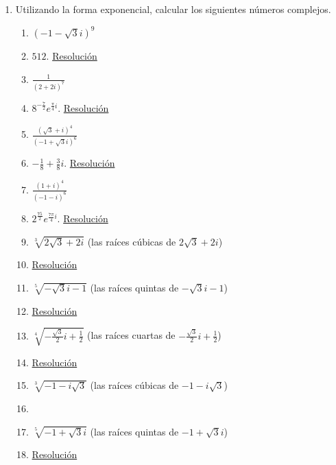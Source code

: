 \documentclass[a4paper]{article}
\newcommand{\answer}{\item[**]}
\newcommand{\exercise}{\item}
\newcommand{\df}[2]{\displaystyle\frac{#1}{#2}}
\begin{document}
\begin{enumerate}
\begin{enumerate} [label=(\alph*)]
		\item $\df{y+3i}{2-5i}$ es un número real puro
		\answer $y=-\df{6}{5}$\. href{https://youtu.be/cgQsvNewGZ0}{Resolución}

		\item $(5x+2m)+m^3i = 9-27i$
		\answer $(x,m)=(3,-3)$. \href{https://youtu.be/kQmzdYU4EsY}{Resolución}

	\end{enumerate}


	\exercise Utilizando la forma exponencial, calcular los siguientes números complejos.
	\begin{multicols}{2}
	\begin{enumerate} [label=(\alph*)]
		
		\item $(-1-\sqrt{3}i)^9$
		\answer $512$. \href{https://youtu.be/bi_tVZZeAtY}{Resolución}

		\item $\df{1}{(2+2i)^7}$
		\answer $8^{-\frac{7}{2}} e^{\frac{\pi}{4}i}$. \href{https://youtu.be/5ET1IAoQNdc}{Resolución}

		\item $\df{(\sqrt{3}+i)^4}{(-1+\sqrt{3}i)^6}$
		\answer $-\df{1}{8}+\df{3}{8}i$. \href{https://youtu.be/xveCBuIad3s}{Resolución}

		\item $\df{(1+i)^4}{(-1-i)^6}$
		\answer $2^{\frac{75}{2}} e^{\frac{7\pi}{4}i}$. \href{https://youtu.be/fyrIGxGpW8g}{Resolución}

		\item $\sqrt[3]{2\sqrt{3}+2i}$ (las raíces cúbicas de $2\sqrt{3}+2i$)
		\answer \href{https://youtu.be/5Z0cwrDtvzU}{Resolución}

		\item $\sqrt[5]{-\sqrt{3}i-1}$ (las raíces quintas de $-\sqrt{3}i-1$)
		\answer \href{https://youtu.be/egki90qZmjQ}{Resolución}

		\item $\sqrt[4]{-\df{\sqrt{3}}{2}i+\df{1}{2}}$ (las raíces cuartas de $-\df{\sqrt{3}}{2}i+\df{1}{2}$)
		\answer \href{https://youtu.be/GuqxEvxgHkQ}{Resolución}

		\item $\sqrt[3]{-1-i\sqrt{3}}$ (las raíces cúbicas de $-1-i\sqrt{3}$)
		\answer {}

		\item $\sqrt[5]{-1+\sqrt{3}i}$ (las raíces quintas de $-1+\sqrt{3}i$)
		\answer \href{https://youtu.be/Be6upizltaE}{Resolución}



\end{enumerate}
\end{multicols}
\end{enumerate}
\end{document}
